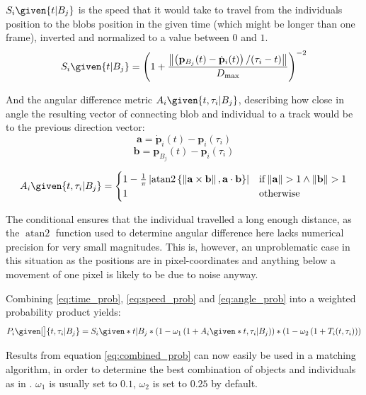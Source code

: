 \documentclass[9pt,lineno]{elife}
\newcommand{\norm}[1]{\left\lVert#1\right\rVert}
\DeclareMathOperator{\atantwo}{atan2}
\begin{document}
\begin{appendixbox}
$S_{i}\given{t|B_j}$ is the speed that it would take to travel from the individuals position to the blobs position in the given time (which might be longer than one frame), inverted and normalized to a value between $0$ and $1$.
    \begin{equation} \label{eq:speed_prob}
        S_{i}\given{t | B_j} = \left(1 + \frac{\norm{ \left(\mathbf{p}_{B_j}(t) - \dot{\mathbf{p}}_i(t) \right) / (\tau_i - t) }}{ D_{\mathrm{max}}}\right)^{-2}
    \end{equation}
    
And the angular difference metric $A_{i}\given{t,\tau_i | B_j}$, describing how close in angle the resulting vector of connecting blob and individual to a track would be to the previous direction vector:
    $$ \mathbf{a} = \dot{\mathbf{p}}_i(t) - \mathbf{p}_i(\tau_i)  $$
    $$ \mathbf{b} = \mathbf{p}_{B_j}(t) - \mathbf{p}_i(\tau_i) $$
    
    \begin{equation} \label{eq:angle_prob}
        A_{i}\given{t,\tau_i | B_j } =
        \begin{cases}
            1 - \frac{1}{\pi}\left|\atantwo\left\{\norm{ \mathbf{a}\times \mathbf{b} }, \mathbf{a}\cdot \mathbf{b}\right\}\right| & \mathrm{if} \norm{\mathbf{a}} > 1 \wedge \norm{\mathbf{b}} > 1 \\
            1 & \mathrm{otherwise}
        \end{cases}
    \end{equation}
    
The conditional ensures that the individual travelled a long enough distance, as the $\atantwo$ function used to determine angular difference here lacks numerical precision for very small magnitudes. This is, however, an unproblematic case in this situation as the positions are in pixel-coordinates and anything below a movement of one pixel is likely to be due to noise anyway.

Combining \eqref{eq:time_prob}, \eqref{eq:speed_prob} and \eqref{eq:angle_prob} into a weighted probability product yields:
\begin{equation} \label{eq:combined_prob}
P_{i} \given[\big]{t,\tau_i | B_j } =  S_{i} \given*{t | B_j} * \left(1 - \omega_1 \left(1 + A_{i} \given*{t,\tau_i | B_j } \right) \right) * \left(1 - \omega_2 \left( 1 +  T_{i}(t,\tau_i) \right) \right)
\end{equation}

Results from equation \eqref{eq:combined_prob} can now easily be used in a matching algorithm, in order to determine the best combination of objects and individuals as in . $\omega_1$ is usually set to $0.1$, $\omega_2$ is set to $0.25$ by default.

\end{appendixbox}
\end{document}
